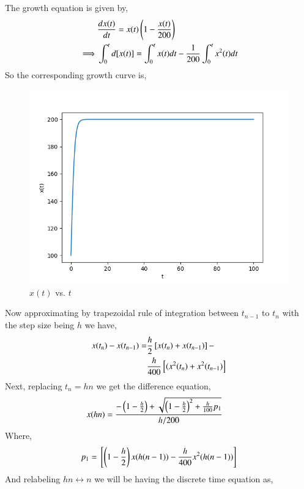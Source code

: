\documentclass[journal,12pt,twocolumn]{IEEEtran}
\theoremstyle{remark}
\begin{document}
\solution

The growth equation is given by,
\begin{align}
    &\frac{dx(t)}{dt}=x(t)\left(1-\frac{x(t)}{200}\right) \\
    \implies &\int_{0}^{t}d[x(t)]=\int_{0}^{t}x(t)dt-\frac{1}{200}\int_{0}^{t}x^2(t)dt \\
\end{align}
So the corresponding growth curve is,
\begin{figure}[h]
    \centering
    \includegraphics[width=0.95\columnwidth]{figs/CT.png}
    \caption{$x(t)$ vs. $t$}
\end{figure}
\newline
Now approximating by trapezoidal rule of integration between $t_{n-1}$ to $t_n$ with the step size being $h$ we have,
\begin{align}
    \begin{split}
        x(t_n)-x(t_{n-1})=&\frac{h}{2}{}\left[x(t_n)+x(t_{n-1})\right]- \\
        &\frac{h}{400}{}\left[(x^2(t_n)+x^2(t_{n-1})\right]
    \end{split}
\end{align}
Next, replacing $t_{n}=hn$ we get the difference equation,
\begin{align}
    &x(hn)=\frac{-\left(1-\frac{h}{2}\right)+\sqrt{\left(1-\frac{h}{2}\right)^2+\frac{h}{100}p_1}}{h/200}
\end{align}
Where,
\begin{align}
    p_1={}\left[\left(1-\frac{h}{2}\right)x(h(n-1))-\frac{h}{400}x^2(h(n-1))\right]
\end{align}
And relabeling $hn\longleftrightarrow n$ we will be having the discrete time equation as,
\end{document}
